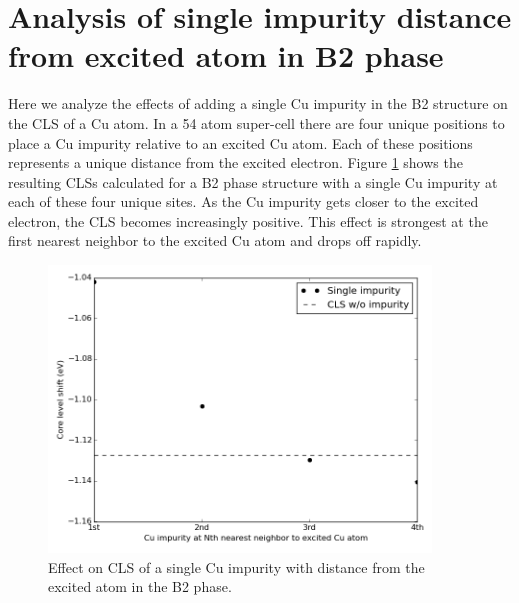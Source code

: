 \documentclass[number, sort&compress, review, 12pt]{elsarticle}
\begin{document}
\section{Analysis of single impurity distance from excited atom in B2 phase}
\label{sec-9}
Here we analyze the effects of adding a single Cu impurity in the B2 structure on the CLS of a Cu atom. In a 54 atom super-cell there are four unique positions to place a Cu impurity relative to an excited Cu atom. Each of these positions represents a unique distance from the excited electron. Figure \ref{fig-imp} shows the resulting CLSs calculated for a B2 phase structure with a single Cu impurity at each of these four unique sites. As the Cu impurity gets closer to the excited electron, the CLS becomes increasingly positive. This effect is strongest at the first nearest neighbor to the excited Cu atom and drops off rapidly.

\begin{figure}[H]
\centering
\includegraphics[width=4in]{./images/impurity.png}
\caption{\label{fig-imp}Effect on CLS of a single Cu impurity with distance from the excited atom in the B2 phase.}
\end{figure}
\end{document}
